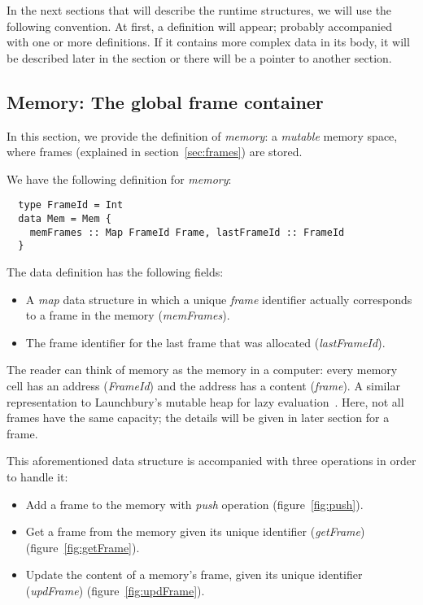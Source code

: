 \documentclass[diploma]{softlab-thesis}
\begin{document}
In the next sections that will describe the runtime structures, we will use the following convention. At first, a definition 
will appear; probably accompanied with one or more definitions. If it contains more complex data in its body, it will be 
described later in the section or there will be a pointer to another section.

\subsection{Memory: The global frame container}

In this section, we provide the definition of \textit{memory}: 
a \textit{mutable} memory space, where frames (explained in section~\ref{sec:frames}) are stored.

We have the following definition for \textit{memory}:
\begin{verbatim}
  type FrameId = Int
  data Mem = Mem {
    memFrames :: Map FrameId Frame, lastFrameId :: FrameId
  }
\end{verbatim}

The data definition has the following fields:
\begin{itemize}
  \item A \textit{map} data structure in which a unique \textit{frame} identifier actually corresponds to 
  a frame in the memory (\textit{memFrames}). 
  \item The frame identifier for the last frame that was allocated (\textit{lastFrameId}).
\end{itemize}

The reader can think of memory as the memory in a computer: every memory cell has an address (\textit{FrameId}) and 
the address has a content (\textit{frame}). A similar representation to Launchbury's mutable heap for 
lazy evaluation~\cite{La93}.
Here, not all frames have the same capacity; the details will be given in later section for a frame.
\newline
\par This aforementioned data structure is accompanied with three operations in order to handle it:
\begin{itemize}
  \item Add a frame to the memory with \textit{push} operation (figure~\ref{fig:push}).
  \item Get a frame from the memory given its unique identifier (\textit{getFrame})
  (figure~\ref{fig:getFrame}).
  \item Update the content of a memory's frame, given its unique identifier (\textit{updFrame})
  (figure~\ref{fig:updFrame}).
\end{itemize}
\end{document}
